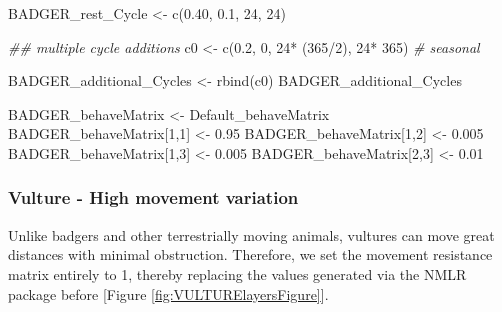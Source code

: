 \documentclass[10pt,a4paper]{article}
\newenvironment{Shaded}{}{}
\newcommand{\CommentTok}[1]{\textit{#1}}
\newcommand{\DecValTok}[1]{#1}
\newcommand{\DocumentationTok}[1]{\textit{#1}}
\newcommand{\FloatTok}[1]{#1}
\newcommand{\FunctionTok}[1]{#1}
\newcommand{\NormalTok}[1]{#1}
\newcommand{\OtherTok}[1]{#1}
\newcommand{\SpecialCharTok}[1]{#1}
\begin{document}
\begin{Shaded}
\begin{Highlighting}[]
\NormalTok{BADGER\_rest\_Cycle }\OtherTok{\textless{}{-}} \FunctionTok{c}\NormalTok{(}\FloatTok{0.40}\NormalTok{, }\FloatTok{0.1}\NormalTok{, }\DecValTok{24}\NormalTok{, }\DecValTok{24}\NormalTok{)}

\DocumentationTok{\#\# multiple cycle additions}
\NormalTok{c0 }\OtherTok{\textless{}{-}} \FunctionTok{c}\NormalTok{(}\FloatTok{0.2}\NormalTok{, }\DecValTok{0}\NormalTok{, }\DecValTok{24}\SpecialCharTok{*}\NormalTok{ (}\DecValTok{365}\SpecialCharTok{/}\DecValTok{2}\NormalTok{), }\DecValTok{24}\SpecialCharTok{*} \DecValTok{365}\NormalTok{) }\CommentTok{\# seasonal}

\NormalTok{BADGER\_additional\_Cycles }\OtherTok{\textless{}{-}} \FunctionTok{rbind}\NormalTok{(c0)}
\NormalTok{BADGER\_additional\_Cycles}

\NormalTok{BADGER\_behaveMatrix }\OtherTok{\textless{}{-}}\NormalTok{ Default\_behaveMatrix}
\NormalTok{BADGER\_behaveMatrix[}\DecValTok{1}\NormalTok{,}\DecValTok{1}\NormalTok{] }\OtherTok{\textless{}{-}} \FloatTok{0.95}
\NormalTok{BADGER\_behaveMatrix[}\DecValTok{1}\NormalTok{,}\DecValTok{2}\NormalTok{] }\OtherTok{\textless{}{-}} \FloatTok{0.005}
\NormalTok{BADGER\_behaveMatrix[}\DecValTok{1}\NormalTok{,}\DecValTok{3}\NormalTok{] }\OtherTok{\textless{}{-}} \FloatTok{0.005}
\NormalTok{BADGER\_behaveMatrix[}\DecValTok{2}\NormalTok{,}\DecValTok{3}\NormalTok{] }\OtherTok{\textless{}{-}} \FloatTok{0.01}
\end{Highlighting}
\end{Shaded}

\hypertarget{vulture---high-movement-variation}{%
\subsubsection{Vulture - High movement variation}\label{vulture---high-movement-variation}}

Unlike badgers and other terrestrially moving animals, vultures can move great distances with minimal obstruction.
Therefore, we set the movement resistance matrix entirely to 1, thereby replacing the values generated via the NMLR package before {[}Figure \ref{fig:VULTURElayersFigure}{]}.

\begin{Shaded}
\end{Shaded}
\end{document}
